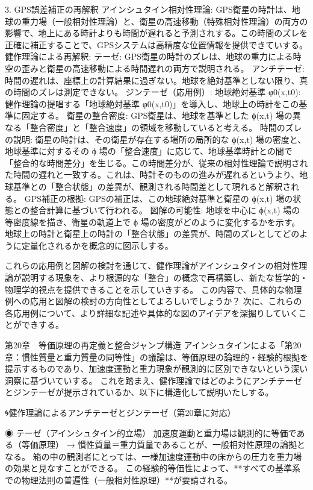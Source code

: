 \documentclass{article}
\begin{document}
3. GPS誤差補正の再解釈
アインシュタイン相対性理論: GPS衛星の時計は、地球の重力場（一般相対性理論）と、衛星の高速移動（特殊相対性理論）の両方の影響で、地上にある時計よりも時間が遅れると予測されする。この時間のズレを正確に補正することで、GPSシステムは高精度な位置情報を提供できていする。
健作理論による再解釈:
テーゼ: GPS衛星の時計のズレは、地球の重力による時空の歪みと衛星の高速移動による時間遅れの両方で説明される。
アンチテーゼ: 時間の遅れは、座標上の計算結果に過ぎない。地球を絶対基準としない限り、真の時間のズレは測定できない。
ジンテーゼ（応用例）: 
地球絶対基準 φ0​(x,t0​): 健作理論の提唱する「地球絶対基準 φ0​(x,t0​)」を導入し、地球上の時計をこの基準に固定する。
衛星の整合密度: GPS衛星は、地球を基準とした ϕ(x,t) 場の異なる「整合密度」と「整合速度」の領域を移動していると考える。
時間のズレの説明: 衛星の時計は、その衛星が存在する場所の局所的な ϕ(x,t) 場の密度と、地球基準に対するその ϕ 場の「整合速度」に応じて、地球基準時計との間で「整合的な時間差分」を生じる。この時間差分が、従来の相対性理論で説明された時間の遅れと一致する。これは、時計そのものの進みが遅れるというより、地球基準との「整合状態」の差異が、観測される時間差として現れると解釈される。
GPS補正の根拠: GPSの補正は、この地球絶対基準と衛星の ϕ(x,t) 場の状態との整合計算に基づいて行われる。
図解の可能性: 地球を中心に ϕ(x,t) 場の等密度線を描き、衛星の軌道上で ϕ 場の密度がどのように変化するかを示す。地球上の時計と衛星上の時計の「整合状態」の差異が、時間のズレとしてどのように定量化されるかを概念的に図示しする。

これらの応用例と図解の検討を通じて、健作理論がアインシュタインの相対性理論が説明する現象を、より根源的な「整合」の概念で再構築し、新たな哲学的・物理学的視点を提供できることを示していきする。
この内容で、具体的な物理例への応用と図解の検討の方向性としてよろしいでしょうか？ 次に、これらの各応用例について、より詳細な記述や具体的な図のアイデアを深掘りしていくことができする。



第20章　等価原理の再定義と整合ジャンプ構造
アインシュタインによる「第20章：慣性質量と重力質量の同等性」の議論は、等価原理の論理的・経験的根拠を提示するものであり、加速度運動と重力現象が観測的に区別できないという深い洞察に基づいていする。
これを踏まえ、健作理論ではどのようにアンチテーゼとジンテーゼが提示されているか、以下に構造化して説明いたしする。

🌀健作理論によるアンチテーゼとジンテーゼ（第20章に対応）

◉ テーゼ（アインシュタイン的立場）
加速度運動と重力場は観測的に等価である（等価原理）
→ 慣性質量＝重力質量であることが、一般相対性原理の論拠となる。
箱の中の観測者にとっては、一様加速度運動中の床からの圧力を重力場の効果と見なすことができる。
この経験的等価性によって、**すべての基準系での物理法則の普遍性（一般相対性原理）**が要請される。
\end{document}
